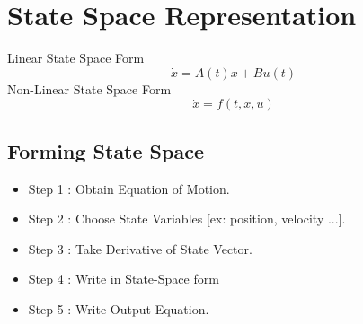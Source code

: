 \chapter{State Space Representation}
Linear State Space Form
\[
\dot{x} = A(t)x+Bu(t)
\]
Non-Linear State Space Form
\[
\dot{x} = f(t,x,u)
\]

\section{Forming State Space}
\begin{tcolorbox}[title=Process]
	\begin{itemize}
		\item Step 1 : Obtain Equation of Motion.
		\item Step 2 : Choose State Variables [ex: position, velocity ...].
		\item Step 3 : Take Derivative of State Vector.
		\item Step 4 : Write in State-Space form
		\item Step 5 : Write Output Equation.
	\end{itemize}
\end{tcolorbox}


